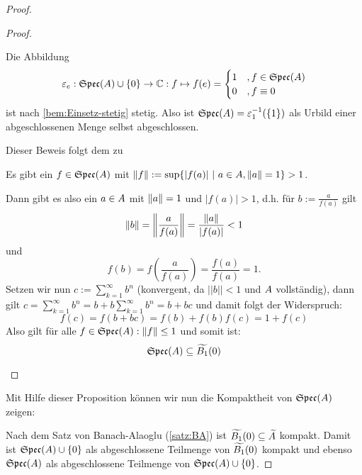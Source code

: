 \begin{proof}
\begin{proof}
\begin{proofenum}
	\item %
	Die Abbildung 
	\[\varepsilon_e: \mathfrak{Spec}(A) \cup \{0\} \to \mathbb{C}: f \mapsto f(e) = \begin{cases} 1 &, f \in \mathfrak{Spec}(A) \\ 0 &, f \equiv 0 \end{cases}\]
	ist nach \cref{bem:Einsetz-stetig} stetig. Also ist $\mathfrak{Spec}(A) = \varepsilon_1^{-1}(\{1\})$ als Urbild einer abgeschlossenen Menge selbst abgeschlossen.
	
	\item Dieser Beweis folgt dem zu \cite[Lemma IX.2.2]{Werner2011}
	
	\Ann Es gibt ein $f \in \mathfrak{Spec}(A)$ mit $\left\lVert f\right\rVert := \sup\{|f(a)| ~|~ a\in A, \left\lVert a\right\rVert = 1\} > 1$. 
	
	Dann gibt es also ein $a \in A$ mit $\left\lVert a\right\rVert = 1$ und $|f(a)| > 1$, d.h. für $b := \frac{a}{f(a)}$ gilt
	\[ \left\lVert b\right\rVert = \left\lVert\frac{a}{f(a)}\right\rVert = \frac{\left\lVert a\right\rVert}{|f(a)|} < 1 \]
	und
	\[ f(b) = f\left(\frac{a}{f(a)}\right) = \frac{f(a)}{f(a)} = 1.\]
	Setzen wir nun $c := \sum_{k=1}^\infty b^n$ (konvergent, da $||b|| < 1$ und $A$ vollständig), dann gilt $c = \sum_{k=1}^\infty b^n = b + b\sum_{k=1}^\infty b^n = b+bc$ und damit folgt der Widerspruch:
	\[f(c) = f(b+bc) = f(b) + f(b)f(c) = 1 + f(c)\]
	Also gilt für alle $f \in \mathfrak{Spec}(A): \left\lVert f\right\rVert \leq 1$ und somit ist:
	\[\mathfrak{Spec}(A) \subseteq \widetilde{B_1}(0)\]\end{proofenum}
\end{proof}

Mit Hilfe dieser Proposition können wir nun die Kompaktheit von $\mathfrak{Spec}(A)$ zeigen:

Nach dem Satz von Banach-Alaoglu (\cref{satz:BA}) ist $\widetilde{B_1}(0) \subseteq \widetilde{A}$ kompakt. Damit ist $\mathfrak{Spec}(A)\cup\{0\}$ als abgeschlossene Teilmenge von $\widetilde{B_1}(0)$ kompakt und ebenso $\mathfrak{Spec}(A)$ als abgeschlossene Teilmenge von $\mathfrak{Spec}(A)\cup\{0\}$.
\end{proof}

